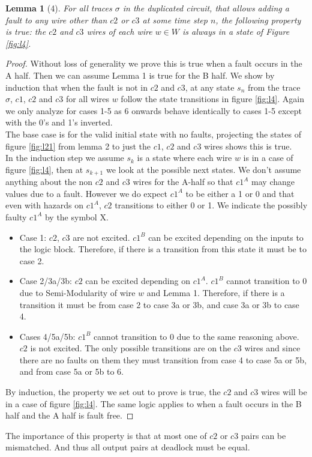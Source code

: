 \documentclass[12pt]{report}
\newtheorem*{lemma}{Lemma}
\begin{document}
\begin{lemma}[4]
For all traces $\sigma$ in the duplicated circuit, that allows adding a fault to any wire other than $c2$ or $c3$ at some time step $n$, the following property is true: the $c2$ and $c3$ wires of each wire $w\in W$ is always in a state of Figure \ref{fig:l4}.
\end{lemma}
\begin{proof}
Without loss of generality we prove this is true when a fault occurs in the A half.  Then we can assume Lemma 1 is true for the B half.  We show by induction that when the fault is not in $c2$ and $c3$, at any state $s_n$ from the trace $\sigma$, $c1$, $c2$ and $c3$ for all wires $w$ follow the state transitions in figure \ref{fig:l4}.  Again we only analyze for cases 1-5 as 6 onwards behave identically to cases 1-5 except with the 0's and 1's inverted.\\

The base case is for the valid initial state with no faults, projecting the states of figure \ref{fig:l21} from lemma 2 to just the $c1$, $c2$ and $c3$ wires shows this is true. \\

In the induction step we assume $s_k$ is a state where each wire $w$ is in a case of figure \ref{fig:l4}, then at $s_{k+1}$ we look at the possible next states.  We don't assume anything about the non $c2$ and $c3$ wires for the A-half so that $c1^A$ may change values due to a fault.  However we do expect $c1^A$ to be either a 1 or 0 and that even with hazards on $c1^A$, $c2$ transitions to either 0 or 1.  We indicate the possibly faulty $c1^A$ by the symbol X.
\begin{itemize}
	\item
Case 1:  $c2$, $c3$ are not excited.  $c1^B$ can be excited depending on the inputs to the logic block.  Therefore, if there is a transition from this state it must be to case 2.
\item
Case 2/3a/3b:  $c2$ can be excited depending on $c1^A$.  $c1^B$ cannot transition to 0 due to Semi-Modularity of wire $w$ and Lemma 1.  Therefore, if there is a transition it must be from case 2 to case 3a or 3b, and case 3a or 3b to case 4.
\item
Cases 4/5a/5b:  $c1^B$ cannot transition to 0 due to the same reasoning above.  $c2$ is not excited. The only possible transitions are on the $c3$ wires and since there are no faults on them they must transition from case 4 to case 5a or 5b, and from case 5a or 5b to 6.
\end{itemize}
By induction, the property we set out to prove is true, the $c2$ and $c3$ wires will be in a case of figure \ref{fig:l4}. 
The same logic applies to when a fault occurs in the B half and the A half is fault free.  
\end{proof}
The importance of this property is that at most one of $c2$ or $c3$ pairs can be mismatched.  And thus all output pairs at deadlock must be equal.
\end{document}
